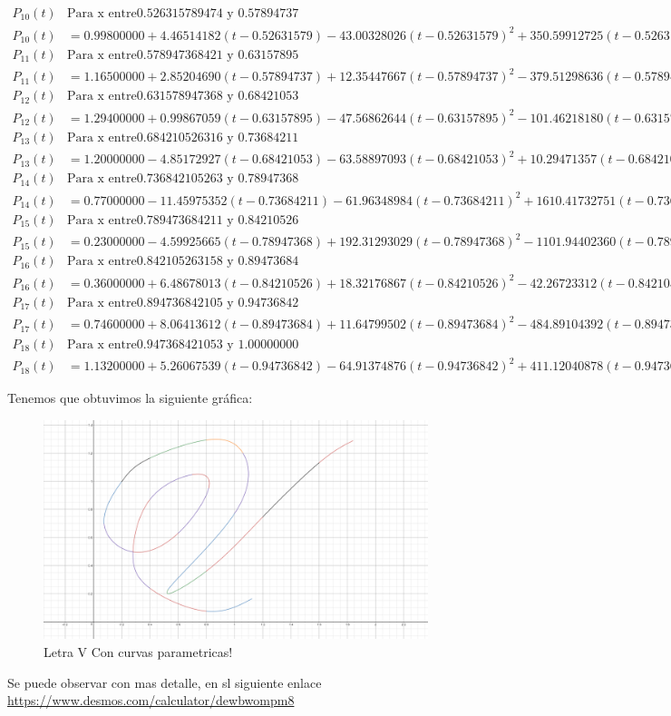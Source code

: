 \begin{align*}
P_10(t) & \text{Para x entre} 0.526315789474 \text{ y } 0.57894737 \\
P_10(t) & = 0.99800000+4.46514182(t-0.52631579)-43.00328026(t-0.52631579)^2+350.59912725(t-0.52631579)^3 \\
P_11(t) & \text{Para x entre} 0.578947368421 \text{ y } 0.63157895 \\
P_11(t) & = 1.16500000+2.85204690(t-0.57894737)+12.35447667(t-0.57894737)^2-379.51298636(t-0.57894737)^3 \\
P_12(t) & \text{Para x entre} 0.631578947368 \text{ y } 0.68421053 \\
P_12(t) & = 1.29400000+0.99867059(t-0.63157895)-47.56862644(t-0.63157895)^2-101.46218180(t-0.63157895)^3 \\
P_13(t) & \text{Para x entre} 0.684210526316 \text{ y } 0.73684211 \\
P_13(t) & = 1.20000000-4.85172927(t-0.68421053)-63.58897093(t-0.68421053)^2+10.29471357(t-0.68421053)^3 \\
P_14(t) & \text{Para x entre} 0.736842105263 \text{ y } 0.78947368 \\
P_14(t) & = 0.77000000-11.45975352(t-0.73684211)-61.96348984(t-0.73684211)^2+1610.41732751(t-0.73684211)^3 \\
P_15(t) & \text{Para x entre} 0.789473684211 \text{ y } 0.84210526 \\
P_15(t) & = 0.23000000-4.59925665(t-0.78947368)+192.31293029(t-0.78947368)^2-1101.94402360(t-0.78947368)^3 \\
P_16(t) & \text{Para x entre} 0.842105263158 \text{ y } 0.89473684 \\
P_16(t) & = 0.36000000+6.48678013(t-0.84210526)+18.32176867(t-0.84210526)^2-42.26723312(t-0.84210526)^3 \\
P_17(t) & \text{Para x entre} 0.894736842105 \text{ y } 0.94736842 \\
P_17(t) & = 0.74600000+8.06413612(t-0.89473684)+11.64799502(t-0.89473684)^2-484.89104392(t-0.89473684)^3 \\
P_18(t) & \text{Para x entre} 0.947368421053 \text{ y } 1.00000000 \\
P_18(t) & = 1.13200000+5.26067539(t-0.94736842)-64.91374876(t-0.94736842)^2+411.12040878(t-0.94736842)^3
\end{align*}

Tenemos que obtuvimos la siguiente gráfica:
\begin{figure}[H]
	\centering
	\includegraphics[scale=0.3]{img/4.png}
	\caption{Letra V Con curvas parametricas!}
\end{figure}

Se puede observar con mas detalle, en sl siguiente enlace 
\url{https://www.desmos.com/calculator/dewbwompm8}